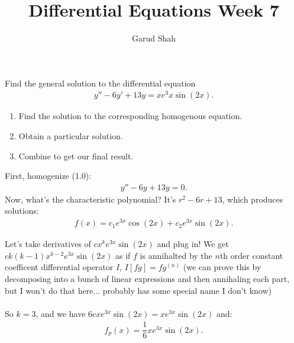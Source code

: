 \documentclass[11pt]{article}
\title{Differential Equations Week \textbf{7}}
\author{Garud Shah}
\begin{document}
    \maketitle \newpage 
    \begin{problem}[Problem 1]
        \setcounter{equation}{0}
        Find the general solution to the differential equation 
        \begin{align}
            y'' - 6y' + 13y = xe^3x\sin(2x).
        \end{align}
    \end{problem}
    \setcounter{solution}{-1}
        \begin{solution}
            \hfill \break
            \begin{enumerate}
                \item Find the solution to the corresponding homogenous equation.
                \item Obtain a particular solution.
                \item Combine to get our final result.
            \end{enumerate}
        \end{solution}
        \begin{solution}
            First, homogenize (1.0):
            \begin{align}
                y'' - 6y + 13y = 0.
            \end{align}
            Now, what's the characteristic polynomial? It's $r^2-6r+13$, which produces solutions:
            \begin{align}
                f(x) = c_1e^{3x}\cos(2x) + c_2e^{3x}\sin(2x).
            \end{align}
        \end{solution}
        \begin{solution}
            Let's take derivatives of $cx^ke^{3x}\sin(2x)$ and plug in! We get $ck(k-1)x^{k-2}e^{3x}\sin(2x)$
            as if $f$ is annihalted by the $n$th order constant coefficent differential operator $I$, $I[fg] = fg^{(n)}$ (we can 
            prove this by decomposing into a bunch of linear expressions and then annihaling each part, but I won't do 
            that here... probably has some special name I don't know) \\~\\
            So $k=3$, and we have $6cxe^{3x}\sin(2x) = xe^{3x}\sin(2x)$ and:
            \begin{align}
                f_p(x) = \dfrac{1}{6}xe^{3x}\sin(2x).
            \end{align}
        \end{solution}
\end{document}
